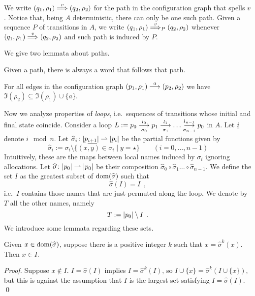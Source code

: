 
%
We write $(q_1,\rho_1) \overset{v}{\Longrightarrow} (q_2,\rho_2)$ for the path in the configuration graph that spells $v$. Notice that, being $A$ deterministic, there can only be one such path. Given a sequence $P$ of transitions in $A$, we write $(q_1,\rho_1) \overset{v}{\Longrightarrow}_{P} (q_2,\rho_2)$ whenever $(q_1,\rho_1) \overset{v}{\Longrightarrow} (q_2,\rho_2)$ and such path is induced by $P$.

We give two lemmata about paths.
\begin{lemma}
Given a path, there is always a word that follows that path.
\end{lemma}


\begin{lemma}
\label{lem:tr-names}
For all edges in the configuration graph $(p_1,\rho_1) \overset{a}{\longrightarrow} (p_2,\rho_2)$ we have $\Im(\rho_2) \subseteq \Im(\rho_1) \cup \{ a \}$.
\end{lemma}

Now we analyze properties of \emph{loops}, i.e.\ sequences of transitions whose initial and final state coincide. Consider a loop $L := p_0 \overset{l_0}{\underset{\sigma_0}{\longrightarrow}} p_1 \overset{l_1}{\underset{\sigma_1}{\longrightarrow}} \dots \overset{l_{n-1}}{\underset{\sigma_{n-1}}{\longrightarrow}} p_0$ in $A$. Let ${\underline{i}}$ denote $i \mod n$. Let $\widehat{\sigma}_i \colon |p_{\underline{i+1}}| \rightharpoonup |p_i|$ be the partial functions given by
\[
	\widehat{\sigma}_i := \sigma_i \setminus \{ (x,y) \in \sigma_i \mid y = \star \} 
	\qquad (i=0,\dots,n-1)
\]
Intuitively, these are the maps between local names induced by $\sigma_i$ ignoring allocations. Let $\widehat{\sigma} \colon |p_0| \rightharpoonup |p_0|$ be their composition $\widehat{\sigma}_0 \circ \widehat{\sigma}_1 \dots \circ \widehat{\sigma}_{n-1}$. We define the set $I$ as the greatest subset of $\operatorname{dom}(\widehat{\sigma})$ such that
\[
	\widehat{\sigma}(I) = I \enspace ,
\]
i.e.\ $I$ contains those names that are just permuted along the loop. We denote by $T$ all the other names, namely 
\[
	T := |p_0| \setminus I \enspace .
\]
%
We introduce some lemmata regarding these sets.

\begin{lemma}
\label{lem:xI}
Given $x \in \operatorname{dom}(\widehat{\sigma})$, suppose there is a positive integer $k$ such that $x = \widehat{\sigma}^k (x)$. Then $x \in I$.
\end{lemma}
\begin{proof}
Suppose $x \notin I$. $I = \widehat{\sigma}(I)$ implies $I = \widehat{\sigma}^k(I)$, so $I \cup \{x\} = \widehat{\sigma}^k(I \cup \{x\})$, but this is against the assumption that $I$ is the largest set satisfying $I = \widehat{\sigma}(I)$.
\qed
\end{proof}

